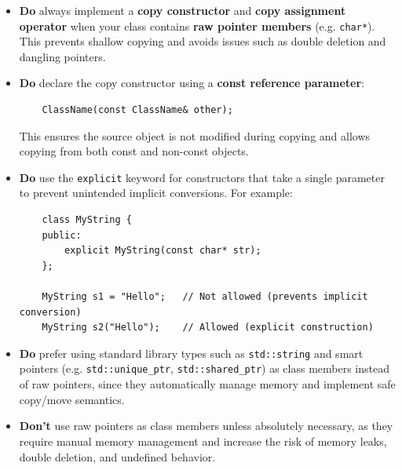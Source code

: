 \documentclass[10pt]{article}
\begin{document}
\newpage
\begin{tcolorbox}
\begin{itemize}
    \item \textbf{Do} always implement a \textbf{copy constructor} and \textbf{copy assignment operator} when your class contains \textbf{raw pointer members} (e.g. \verb|char*|). This prevents shallow copying and avoids issues such as double deletion and dangling pointers.

    \item \textbf{Do} declare the copy constructor using a \textbf{const reference parameter}:
    \begin{verbatim}
    ClassName(const ClassName& other);
    \end{verbatim}
    This ensures the source object is not modified during copying and allows copying from both const and non-const objects.

    \item \textbf{Do} use the \verb|explicit| keyword for constructors that take a single parameter to prevent unintended implicit conversions. For example:
    \begin{verbatim}
    class MyString {
    public:
        explicit MyString(const char* str);
    };

    MyString s1 = "Hello";   // Not allowed (prevents implicit conversion)
    MyString s2("Hello");    // Allowed (explicit construction)
    \end{verbatim}

    \item \textbf{Do} prefer using standard library types such as \verb|std::string| and smart pointers (e.g. \verb|std::unique_ptr|, \verb|std::shared_ptr|) as class members instead of raw pointers, since they automatically manage memory and implement safe copy/move semantics.

    \item \textbf{Don't} use raw pointers as class members unless absolutely necessary, as they require manual memory management and increase the risk of memory leaks, double deletion, and undefined behavior.
\end{itemize}
\end{tcolorbox}

\newpage
\end{document}
